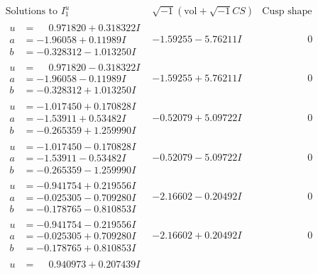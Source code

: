 \documentclass[1p]{elsarticle_modified}
\theoremstyle{definition}
\newcommand{\I}{\sqrt{-1}}
\begin{document}
$$\begin{array}{c|c|c}  
\text{Solutions to }I^u_{1}& \I (\text{vol} + \sqrt{-1}CS) & \text{Cusp shape}\\
 \hline 
\begin{aligned}
u &= \phantom{-}0.971820 + 0.318322 I \\
a &= -1.96058 + 0.11989 I \\
b &= -0.328312 - 1.013250 I\end{aligned}
 & -1.59255 - 5.76211 I & \phantom{-0.000000 } 0 \\ \hline\begin{aligned}
u &= \phantom{-}0.971820 - 0.318322 I \\
a &= -1.96058 - 0.11989 I \\
b &= -0.328312 + 1.013250 I\end{aligned}
 & -1.59255 + 5.76211 I & \phantom{-0.000000 } 0 \\ \hline\begin{aligned}
u &= -1.017450 + 0.170828 I \\
a &= -1.53911 + 0.53482 I \\
b &= -0.265359 + 1.259990 I\end{aligned}
 & -0.52079 + 5.09722 I & \phantom{-0.000000 } 0 \\ \hline\begin{aligned}
u &= -1.017450 - 0.170828 I \\
a &= -1.53911 - 0.53482 I \\
b &= -0.265359 - 1.259990 I\end{aligned}
 & -0.52079 - 5.09722 I & \phantom{-0.000000 } 0 \\ \hline\begin{aligned}
u &= -0.941754 + 0.219556 I \\
a &= -0.025305 - 0.709280 I \\
b &= -0.178765 - 0.810853 I\end{aligned}
 & -2.16602 - 0.20492 I & \phantom{-0.000000 } 0 \\ \hline\begin{aligned}
u &= -0.941754 - 0.219556 I \\
a &= -0.025305 + 0.709280 I \\
b &= -0.178765 + 0.810853 I\end{aligned}
 & -2.16602 + 0.20492 I & \phantom{-0.000000 } 0 \\ \hline\begin{aligned}
u &= \phantom{-}0.940973 + 0.207439 I \\

\end{aligned}
\end{array}$$
\end{document}
